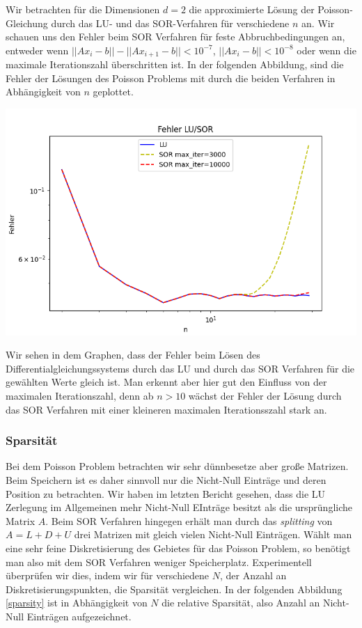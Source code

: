 \documentclass[smallheadings]{scrartcl}
\theoremstyle{definition}
\begin{document}
Wir betrachten für die Dimensionen $d=2$ die approximierte Lösung der Poisson-Gleichung durch das LU- und das SOR-Verfahren für verschiedene  $n$ an.   Wir schauen uns den Fehler beim SOR Verfahren für feste Abbruchbedingungen an,  entweder wenn $||Ax_i-b||-||Ax_{i+1}-b||<10^{-7}$, $||Ax_i-b||<10^{-8}$ oder wenn die maximale Iterationszahl überschritten ist.  In der folgenden Abbildung,  sind die Fehler der Lösungen des Poisson Problems mit durch die beiden Verfahren in Abhängigkeit von $n$ geplottet.




\begin{minipage}{\textwidth}

 \centering
 \includegraphics[scale = 0.8]{Errorlu1}
 	\label{errorcomp}

 \end{minipage}
 
 Wir sehen in dem Graphen, dass der Fehler beim Lösen des Differentialgleichungssystems durch das LU und durch das SOR Verfahren für die gewählten Werte gleich ist.  Man erkennt aber hier gut den Einfluss von der maximalen Iterationszahl, denn ab $n>10$ wächst der Fehler der Lösung durch das SOR Verfahren mit einer kleineren maximalen Iterationsszahl stark an.
 
 

\subsubsection{Sparsität}
Bei dem Poisson Problem betrachten wir sehr dünnbesetze aber große Matrizen.  Beim Speichern ist es daher sinnvoll nur die Nicht-Null Einträge und deren Position zu betrachten.  Wir haben im letzten Bericht gesehen,  dass die LU Zerlegung im Allgemeinen mehr Nicht-Null EInträge besitzt als die ursprüngliche Matrix $A$.  Beim SOR Verfahren hingegen erhält man durch das \textit{splitting} von $A=L+D+U$ drei Matrizen mit gleich vielen Nicht-Null Einträgen.  Wählt man eine sehr feine Diskretisierung des Gebietes für das Poisson Problem,  so benötigt man also mit dem SOR Verfahren weniger Speicherplatz.   Experimentell überprüfen wir dies, indem wir für verschiedene $N$, der Anzahl an Diskretisierungspunkten, die Sparsität vergleichen. 
In der folgenden Abbildung \ref{sparsity} ist in Abhängigkeit von $N$ die relative Sparsität, also Anzahl an Nicht-Null Einträgen aufgezeichnet. 
\end{document}
